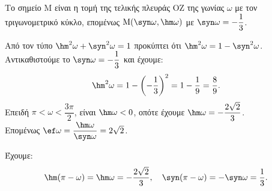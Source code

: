 \begin{alist}
\item Το σημείο $\text{M}$ είναι η τομή της τελικής πλευράς $\text{ΟZ}$ της γωνίας $\omega$ με τον τριγωνομετρικό κύκλο, επομένως $\text{M}(\syn \omega, \hm \omega)$ με $\syn \omega = -\dfrac{1}{3}$.
\item Από τον τύπο $\hm ^2\omega + \syn ^2\omega = 1$ προκύπτει ότι $\hm ^2\omega = 1 - \syn ^2\omega$. \\
Αντικαθιστούμε το $\syn \omega = -\dfrac{1}{3}$ και έχουμε:
\[\hm ^2\omega = 1 - \left(-\frac{1}{3}\right)^2 = 1 - \frac{1}{9} = \frac{8}{9}.\]
Επειδή $\pi < \omega < \dfrac{3\pi}{2}$, είναι $\hm \omega < 0$, οπότε έχουμε $\hm \omega = -\dfrac{2\sqrt{2}}{3}$. \\
Επομένως $\ef \omega = \dfrac{\hm \omega}{\syn \omega} = 2\sqrt{2}$.
\item Έχουμε:
\[\hm (\pi - \omega) = \hm \omega = -\frac{2\sqrt{2}}{3}, \quad \syn (\pi - \omega) = -\syn \omega = \frac{1}{3}.\]
\end{alist}

